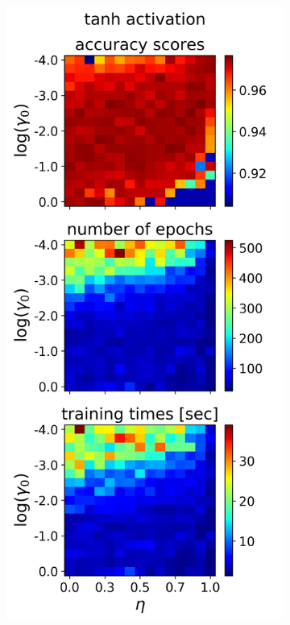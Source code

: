 \documentclass[nofootinbib,reprint,english]{revtex4-1}
\begin{document}
\begin{figure}[h!]
\begin{subfigure}{0.32\textwidth}
	\end{subfigure}
	~
	\begin{subfigure}{0.32\textwidth}
	\centering
	\includegraphics[scale=0.38]{../results/NN/img/gridsearch2_tanh3.png}

\end{subfigure}
\end{figure}
\end{document}
